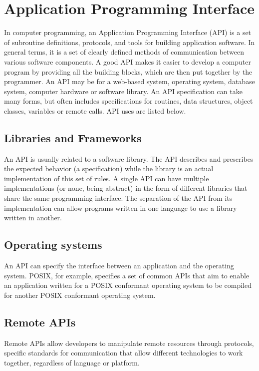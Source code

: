 \section{Application Programming Interface}
In computer programming, an Application Programming Interface (API) is a set of subroutine definitions, protocols, and tools for building application software. In general terms, it is a set of clearly defined methods of communication between various software components. A good API makes it easier to develop a computer program by providing all the building blocks, which are then put together by the programmer. An API may be for a web-based system, operating system, database system, computer hardware or software library. An API specification can take many forms, but often includes specifications for routines, data structures, object classes, variables or remote calls. API uses are listed below.

\subsection{Libraries and Frameworks}
An API is usually related to a software library. The API describes and prescribes the expected behavior (a specification) while the library is an actual implementation of this set of rules. A single API can have multiple implementations (or none, being abstract) in the form of different libraries that share the same programming interface. The separation of the API from its implementation can allow programs written in one language to use a library written in another. 

\subsection{Operating systems}
An API can specify the interface between an application and the operating system. POSIX, for example, specifies a set of common APIs that aim to enable an application written for a POSIX conformant operating system to be compiled for another POSIX conformant operating system.

\subsection{Remote APIs}
Remote APIs allow developers to manipulate remote resources through protocols, specific standards for communication that allow different technologies to work together, regardless of language or platform.


